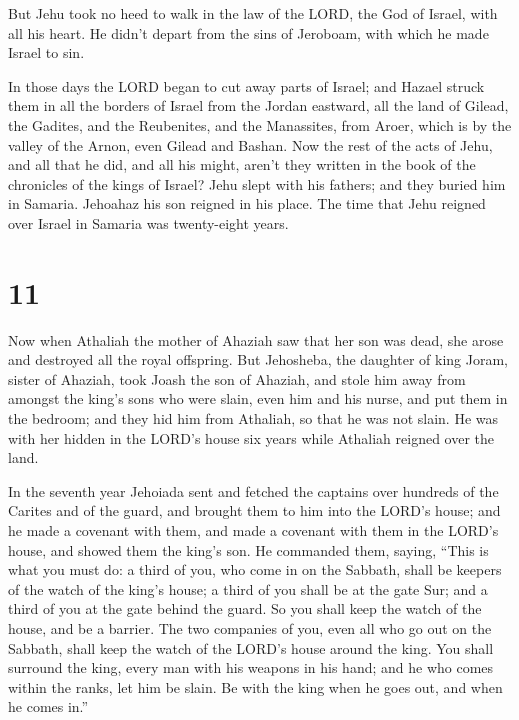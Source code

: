  But Jehu took no heed to walk in the law of the LORD,
the God of Israel, with all his heart. He didn't depart from the sins of
Jeroboam, with which he made Israel to sin.

 In those days the LORD began to cut away parts of
Israel; and Hazael struck them in all the borders of Israel
 from the Jordan eastward, all the land of Gilead, the
Gadites, and the Reubenites, and the Manassites, from Aroer, which is by
the valley of the Arnon, even Gilead and Bashan.  Now the
rest of the acts of Jehu, and all that he did, and all his might, aren't
they written in the book of the chronicles of the kings of Israel?
 Jehu slept with his fathers; and they buried him in
Samaria. Jehoahaz his son reigned in his place.  The time
that Jehu reigned over Israel in Samaria was twenty-eight years.

\hypertarget{section-10}{%
\section{11}\label{section-10}}

 Now when Athaliah the mother of Ahaziah saw that her son
was dead, she arose and destroyed all the royal offspring.
 But Jehosheba, the daughter of king Joram, sister of
Ahaziah, took Joash the son of Ahaziah, and stole him away from amongst
the king's sons who were slain, even him and his nurse, and put them in
the bedroom; and they hid him from Athaliah, so that he was not slain.
 He was with her hidden in the LORD's house six years
while Athaliah reigned over the land.

 In the seventh year Jehoiada sent and fetched the
captains over hundreds of the Carites and of the guard, and brought them
to him into the LORD's house; and he made a covenant with them, and made
a covenant with them in the LORD's house, and showed them the king's
son.  He commanded them, saying, ``This is what you must
do: a third of you, who come in on the Sabbath, shall be keepers of the
watch of the king's house;  a third of you shall be at the
gate Sur; and a third of you at the gate behind the guard. So you shall
keep the watch of the house, and be a barrier.  The two
companies of you, even all who go out on the Sabbath, shall keep the
watch of the LORD's house around the king.  You shall
surround the king, every man with his weapons in his hand; and he who
comes within the ranks, let him be slain. Be with the king when he goes
out, and when he comes in.''

